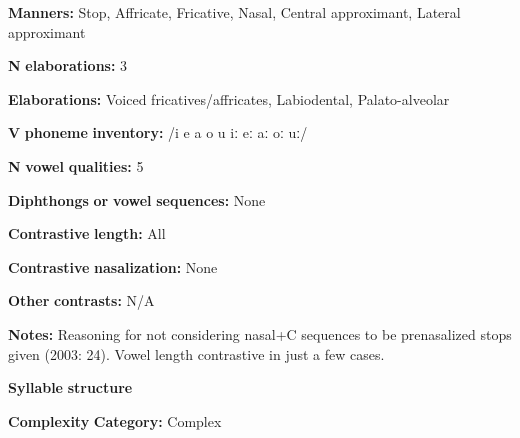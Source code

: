 \documentclass[output=paper]{langsci/langscibook}
\begin{document}
\begin{styleBody}
\textbf{Manners:} Stop, Affricate, Fricative, Nasal, Central approximant, Lateral approximant
\end{styleBody}

\begin{styleBody}
\textbf{N} \textbf{elaborations:} 3
\end{styleBody}

\begin{styleBody}
\textbf{Elaborations:} Voiced fricatives/affricates, Labiodental, Palato-alveolar
\end{styleBody}

\begin{styleBody}
\textbf{V} \textbf{phoneme} \textbf{inventory:} /i e a o u iː eː aː oː uː/
\end{styleBody}

\begin{styleBody}
\textbf{N} \textbf{vowel} \textbf{qualities:} 5
\end{styleBody}

\begin{styleBody}
\textbf{Diphthongs} \textbf{or} \textbf{vowel} \textbf{sequences:} None
\end{styleBody}

\begin{styleBody}
\textbf{Contrastive} \textbf{length:} All
\end{styleBody}

\begin{styleBody}
\textbf{Contrastive} \textbf{nasalization:} None
\end{styleBody}

\begin{styleBody}
\textbf{Other} \textbf{contrasts:} N/A
\end{styleBody}

\begin{styleBody}
\textbf{Notes:} Reasoning for not considering nasal+C sequences to be prenasalized stops given (2003: 24). Vowel length contrastive in just a few cases.
\end{styleBody}

\begin{styleBody}
\textbf{Syllable} \textbf{structure}
\end{styleBody}

\begin{styleBody}
\textbf{Complexity} \textbf{Category:} Complex
\end{styleBody}
\end{document}
